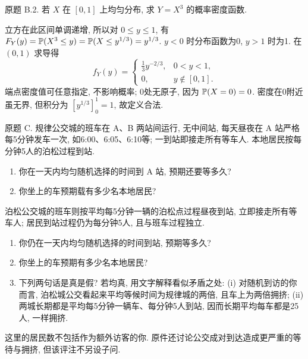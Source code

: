 \begin{exercise}\label{ps5-b2}
原题 B.2. 若 $X$ 在 $[0,1]$ 上均匀分布, 求 $Y=X^3$ 的概率密度函数.
\end{exercise}
\begin{solution}
立方在此区间单调递增, 所以对 $0\le y\le1$, 有
$F_Y(y)=\mathbb P(X^3\le y)=\mathbb P(X\le y^{1/3})=y^{1/3}$.
$y<0$ 时分布函数为0, $y>1$ 时为1. 在 $(0,1)$ 求导得
\[
f_Y(y)=\begin{cases}\tfrac13y^{-2/3},&0<y<1,\\0,&y\notin[0,1].\end{cases}
\]
端点密度值可任意指定, 不影响概率; 0处无原子, 因为 $\mathbb P(X=0)=0$. 密度在0附近虽无界, 但积分为 $[y^{1/3}]_0^1=1$, 故定义合法.
\end{solution}

\begin{exercise}\label{ps5-c}
原题 C. 规律公交城的班车在 A、B 两站间运行, 无中间站, 每天昼夜在 A 站严格每5分钟发车一次, 如6:00、6:05、6:10等; 一到站即接走所有等车人. 本地居民按每分钟5人的泊松过程到站.
\begin{enumerate}[label=(\alph*)]
\item 你在一天内均匀随机选择的时间到 A 站, 预期还要等多久?
\item 你坐上的车预期载有多少名本地居民?
\end{enumerate}
泊松公交城的班车则按平均每5分钟一辆的泊松点过程昼夜到站, 立即接走所有等车人; 居民到站过程仍为每分钟5人, 且与班车过程独立.
\begin{enumerate}[label=(\alph*),start=3]
\item 你仍在一天内均匀随机选择的时间到站, 预期等多久?
\item 你坐上的车预期有多少名本地居民?
\item 下列两句话是真是假? 若均真, 用文字解释看似矛盾之处: (i) 对随机到访的你而言, 泊松城公交看起来平均等候时间为规律城的两倍, 且车上为两倍拥挤; (ii) 两城长期都是平均每5分钟一辆车、每分钟5人到站, 因而长期平均每车都是25人, 一样拥挤.
\end{enumerate}
这里的居民数不包括作为额外访客的你. 原件还讨论公交成对到达造成更严重的等待与拥挤, 但该评注不另设子问.
\end{exercise}
